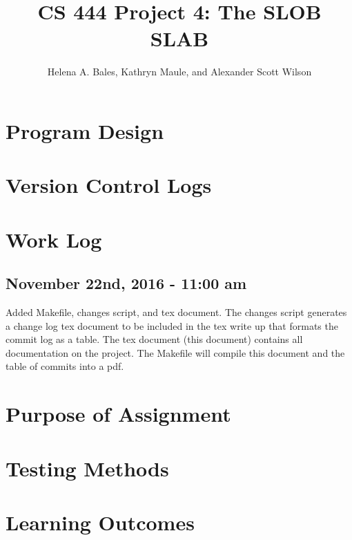 \documentclass[letterpaper,10pt]{article}
\title{CS 444 Project 4: The SLOB SLAB}
\author{Helena A. Bales, Kathryn Maule, and Alexander Scott Wilson }
\begin{document}
\maketitle

\begin{abstract}
\end{abstract}

\clearpage

\tableofcontents

\clearpage

\section{Program Design}

\section{Version Control Logs}


\section{Work Log}
\subsection{November 22nd, 2016 - 11:00 am}
Added Makefile, changes script, and tex document. 
The changes script generates a change log tex document to be included in the tex write up that formats 
the commit log as a table. 
The tex document (this document) contains all documentation on the project. 
The Makefile will compile this document and the table of commits into a pdf.

\section{Purpose of Assignment}
\section{Testing Methods}
\section{Learning Outcomes}
\end{document}
